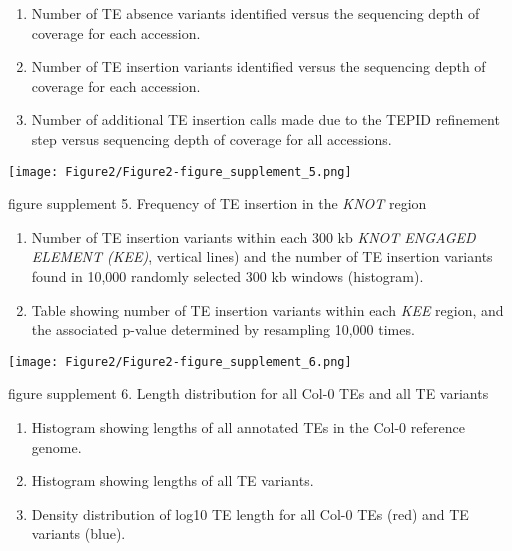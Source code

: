 \documentclass[12pt]{article}
\begin{document}
\begin{enumerate}
\def\labelenumi{(\Alph{enumi})}
\item
  Number of TE absence variants identified versus the sequencing depth
  of coverage for each accession.
\item
  Number of TE insertion variants identified versus the sequencing depth
  of coverage for each accession.
\item
  Number of additional TE insertion calls made due to the TEPID
  refinement step versus sequencing depth of coverage for all
  accessions.
\end{enumerate}

\pagebreak

\setcounter{suppfigure}{1}

\begin{suppfigure}
  \centering
  \texttt{[image: Figure2/Figure2-figure\_supplement\_5.png]}
  \caption{figure supplement 5. Frequency of TE insertion in the \emph{KNOT} region}
  \label{fig2s5}
\end{suppfigure}

\begin{enumerate}
\def\labelenumi{(\Alph{enumi})}
\item
  Number of TE insertion variants within each 300 kb \emph{KNOT ENGAGED ELEMENT (KEE)},
  vertical lines) and the number of TE insertion variants
  found in 10,000 randomly selected 300 kb windows (histogram).
\item
  Table showing number of TE insertion variants within each \emph{KEE}
  region, and the associated p-value determined by resampling 10,000
  times.
\end{enumerate}

\pagebreak

\setcounter{suppfigure}{1}

\begin{suppfigure}
  \centering
  \texttt{[image: Figure2/Figure2-figure\_supplement\_6.png]}
  \caption{figure supplement 6. Length distribution for all Col-0 TEs and all TE variants}
  \label{fig2s6}
\end{suppfigure}

\begin{enumerate}
\def\labelenumi{(\Alph{enumi})}
\item
  Histogram showing lengths of all annotated TEs in the Col-0 reference
  genome.
\item
  Histogram showing lengths of all TE variants.
\item
  Density distribution of log10 TE length for all Col-0 TEs (red) and TE
  variants (blue).
\end{enumerate}
\end{document}

